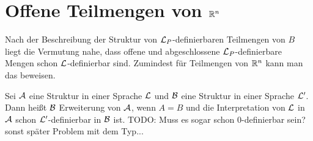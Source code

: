 \section{Offene Teilmengen von $\mathbb{R}^n$}
Nach der Beschreibung der Struktur von $\mathcal{L}_P$-definierbaren Teilmengen von $B$ liegt die Vermutung nahe, dass offene und abgeschlossene $\mathcal{L}_P$-definierbare Mengen schon $\mathcal{L}$-definierbar sind. Zumindest für Teilmengen von $\mathbb{R}^n$ kann man das beweisen.

\begin{definition}
	Sei $\mathcal{A}$ eine Struktur in einer Sprache $\mathcal{L}$ und $\mathcal{B}$ eine Struktur in einer Sprache $\mathcal{L}'$. Dann heißt $\mathcal{B}$ Erweiterung von $\mathcal{A}$, wenn $A=B$ und die Interpretation von $\mathcal{L}$ in $\mathcal{A}$ schon $\mathcal{L}'$-definierbar in $\mathcal{B}$ ist. TODO: Muss es sogar schon 0-definierbar sein? sonst später Problem mit dem Typ...
\end{definition}


